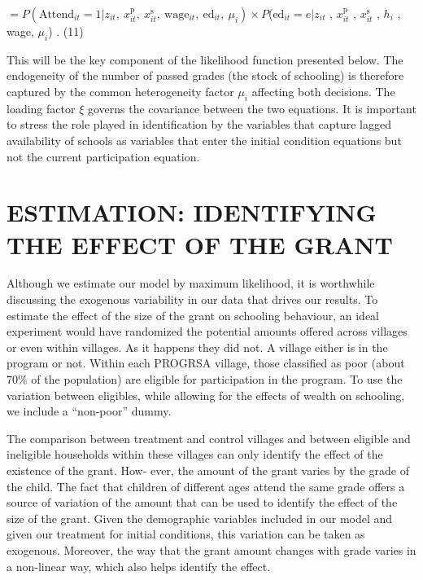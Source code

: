 \documentclass{handoutForSolutions}
\begin{document}
$=P (\mathrm{A}\mathrm{t}\mathrm{t}\mathrm{e}\mathrm{n}\mathrm{d}_{it}=1|z_{it},\ x_{it}^{\mathrm{p}},\ x_{it}^{\mathrm{s}},\ \mathrm{w}\mathrm{a}\mathrm{g}\mathrm{e}_{it},\ \mathrm{e}\mathrm{d}_{it},\ \mu_{i})\times P$($\mathrm{e}\mathrm{d}_{it}=e|z_{it}$ , $x_{it}^{\mathrm{p}}$ , $x_{it}^{\mathrm{s}}$ , $h_{i}$ , wage, $\mu_{i}$) . (11)

This will be the key component of the likelihood function presented below. The endogeneity of the number of passed grades (the stock of schooling) is therefore captured by the common heterogeneity factor $\mu_{i}$ affecting both decisions. The loading factor $\xi$ governs the covariance between the two equations. It is important to stress the role played in identification by the variables that capture lagged availability of schools as variables that enter the initial condition equations but not the current participation equation.

\newpage

\section{ESTIMATION: IDENTIFYING THE EFFECT OF THE GRANT}
Although we estimate our model by maximum likelihood, it is worthwhile discussing the exogenous variability in our data that drives our results. To estimate the effect of the size of the grant on schooling behaviour, an ideal experiment would have randomized the potential amounts offered across villages or even within villages. As it happens they did not. A village either is in the program or not. Within each PROGRSA village, those classified as poor (about 70\% of the population) are eligible for participation in the program. To use the variation between eligibles, while allowing for the effects of wealth on schooling, we include a ``non-poor'' dummy.

The comparison between treatment and control villages and between eligible and ineligible households within these villages can only identify the effect of the existence of the grant. How- ever, the amount of the grant varies by the grade of the child. The fact that children of different ages attend the same grade offers a source of variation of the amount that can be used to identify the effect of the size of the grant. Given the demographic variables included in our model and given our treatment for initial conditions, this variation can be taken as exogenous. Moreover, the way that the grant amount changes with grade varies in a non-linear way, which also helps identify the effect.
\end{document}
